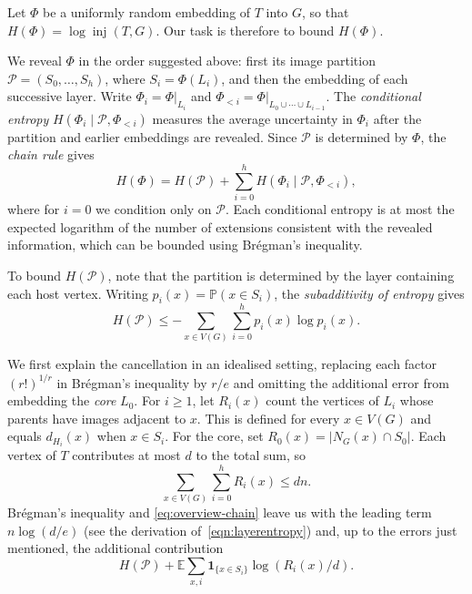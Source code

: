 \documentclass[reqno,final,a4paper]{amsart}
\numberwithin{equation}{section}
\theoremstyle{definition}
\theoremstyle{remark}
\DeclareMathOperator{\inj}{inj}
\begin{document}
Let $\Phi$ be a uniformly random embedding of $T$ into $G$, so that $H(\Phi)=\log\inj(T,G)$. Our task is therefore to bound $H(\Phi)$.

We reveal $\Phi$ in the order suggested above: first its image
partition $\mathcal P=(S_0,\ldots,S_h)$, where $S_i=\Phi(L_i)$,
and then the embedding of each successive layer. Write
$\Phi_i=\Phi|_{L_i}$ and $\Phi_{<i} = \Phi|_{L_0\cup\cdots\cup L_{i-1}}$.
The \emph{conditional entropy} $H(\Phi_i\mid\mathcal P,\Phi_{<i})$ measures the average uncertainty in $\Phi_i$ after the partition and earlier embeddings are revealed. Since $\mathcal P$ is determined by $\Phi$, the \emph{chain rule} gives
\begin{equation}\label{eq:overview-chain}
    H(\Phi)=H(\mathcal P)
    +\sum_{i=0}^h H(\Phi_i\mid\mathcal P,\Phi_{<i}),
\end{equation}
where for $i=0$ we condition only on $\mathcal P$. Each conditional entropy is at most the expected logarithm of the number of extensions consistent with the revealed information, which can be bounded using Br\'egman's inequality.


To bound $H(\mathcal P)$, note that the partition is determined by the layer containing each host vertex. Writing $p_i(x)=\mathbb P(x\in S_i)$, the \emph{subadditivity of entropy} gives
\begin{equation}\label{eq:overview-partition}
    H(\mathcal P)\leq
    -\sum_{x\in V(G)}\sum_{i=0}^h p_i(x)\log p_i(x).
\end{equation}

We first explain the cancellation in an idealised setting, replacing
each factor $(r!)^{1/r}$ in Brégman's inequality by $r/e$ and omitting the additional error from embedding the \textit{core} $L_0$. For $i\ge1$, let $R_i(x)$ count the vertices of $L_i$ whose parents have images adjacent to $x$. 
This is defined for every $x\in V(G)$ and equals $d_{H_i}(x)$ when $x\in S_i$.
For the core, set $R_0(x)=|N_G(x)\cap S_0|$. Each vertex of $T$ contributes at most $d$ to the total sum, so
\begin{equation}\label{eq:overview-weight-sum}
    \sum_{x\in V(G)}\sum_{i=0}^h R_i(x)\leq dn.
\end{equation}
Br\'egman's inequality and \eqref{eq:overview-chain} leave us with
the leading term $n\log(d/e)$ (see the derivation of~\eqref{eqn:layerentropy}) and, up to the errors just mentioned,
the additional contribution
\[
    H(\mathcal P)+
    \mathbb E\sum_{x,i}
    \mathbf 1_{\{x\in S_i\}}\log( R_i(x)/d).
\]
\end{document}
